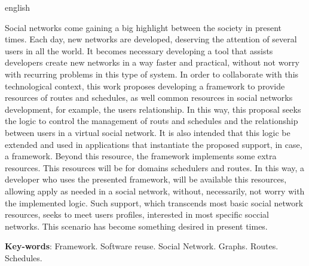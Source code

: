 \begin{resumo}[Abstract]
 \begin{otherlanguage*}{english}
   
   Social networks come gaining a big highlight between the society in present times. Each day, new networks are developed, deserving the attention of several users in all the world. It becomes necessary developing a tool that assists developers create new networks in a way faster and practical, without not worry with recurring problems in this type of system. In order to collaborate with this technological context, this work proposes developing a framework to provide resources of routes and schedules, as well common resources in social networks development, for example, the users relationship. In this way, this proposal seeks the logic to control the management of routs and schedules and the relationship between users in a virtual social network. It is also intended that this logic be extended and used in applications that instantiate the proposed support, in case, a framework. Beyond this resource, the framework implements some extra resources. This resources will be for domains schedulers and routes. In this way, a developer who uses the presented framework, will be available this resources, allowing apply as needed in a social network, without, necessarily, not worry with the implemented logic. Such support, which transcends most basic social network resources, seeks to meet users profiles, interested in most specific soccial networks. This scenario has become something desired in present times.

   \vspace{\onelineskip}
 
   \noindent 
   \textbf{Key-words}: Framework. Software reuse. Social Network. Graphs. Routes. Schedules.
 \end{otherlanguage*}
\end{resumo}
